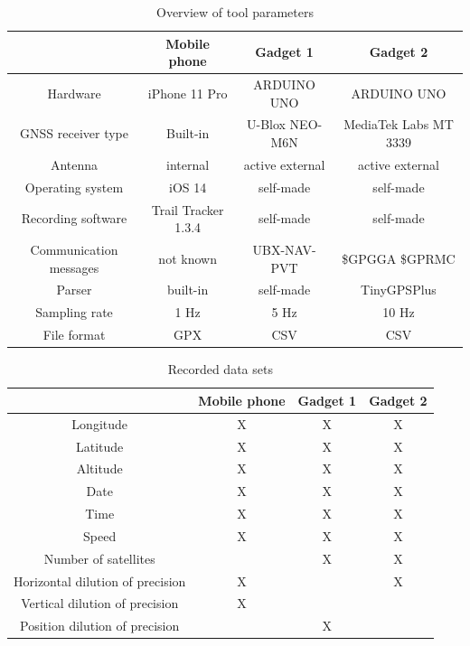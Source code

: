 \documentclass{article}
\begin{document}
			\begin{table}[h]
				\centering
				\begin{tabular}{|c|c|c|c|}
					\hline 
					& Mobile phone & Gadget 1 & Gadget 2 \\ 
					\hline 
					Hardware & iPhone 11 Pro & ARDUINO UNO & ARDUINO UNO \\ 
					\hline 
					GNSS receiver type & Built-in & U-Blox NEO-M6N & MediaTek Labs MT 3339 \\ 
					\hline 
					Antenna & internal & active external & active external \\ 
					\hline 
					Operating system & iOS 14 & self-made & self-made \\ 
					\hline 
					Recording software & Trail Tracker 1.3.4 & self-made & self-made \\ 
					\hline 
					Communication messages & not known & UBX-NAV-PVT & \$GPGGA \$GPRMC \\ 
					\hline 
					Parser & built-in & self-made & TinyGPSPlus \\
					\hline 
					Sampling rate & 1 Hz & 5 Hz & 10 Hz \\ 
					\hline 
					File format & GPX & CSV & CSV \\ 
					\hline 
				\end{tabular} 
				\caption{Overview of tool parameters}
				\label{table:toolparams}
			\end{table}
			\begin{table}[h]
				\centering
				\begin{tabular}{|c|c|c|c|}
					\hline 
					& Mobile phone & Gadget 1 & Gadget 2 \\ 
					\hline 
					Longitude & X & X & X \\ 
					\hline 
					Latitude & X & X & X \\ 
					\hline 
					Altitude & X & X & X \\ 
					\hline 
					Date & X & X & X \\ 
					\hline 
					Time & X & X & X \\ 
					\hline 
					Speed & X & X & X \\ 
					\hline 
					Number of satellites & & X & X \\ 
					\hline 
					Horizontal dilution of precision & X & & X \\ 
					\hline 
					Vertical dilution of precision & X & & \\
					\hline 
					Position dilution of precision & & X &  \\ 
					\hline 
				\end{tabular} 
				\caption{Recorded data sets}
				\label{table:datasets}
			\end{table}
\end{document}
